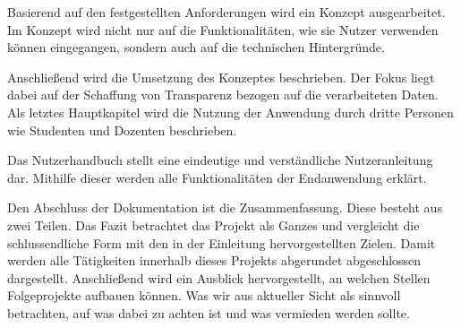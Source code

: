 Basierend auf den festgestellten Anforderungen wird ein Konzept ausgearbeitet.
Im Konzept wird nicht nur auf die Funktionalitäten, wie sie Nutzer verwenden können eingegangen, sondern auch auf die technischen Hintergründe.

Anschließend wird die Umsetzung des Konzeptes beschrieben.
Der Fokus liegt dabei auf der Schaffung von Transparenz bezogen auf die verarbeiteten Daten.
Als letztes Hauptkapitel wird die Nutzung der Anwendung durch dritte Personen wie Studenten und Dozenten beschrieben.

Das Nutzerhandbuch stellt eine eindeutige und verständliche Nutzeranleitung dar.
Mithilfe dieser werden alle Funktionalitäten der Endanwendung erklärt.

Den Abschluss der Dokumentation ist die Zusammenfassung.
Diese besteht aus zwei Teilen.
Das Fazit betrachtet das Projekt als Ganzes und vergleicht die schlussendliche Form mit den in der Einleitung hervorgestellten Zielen. Damit werden alle Tätigkeiten innerhalb dieses Projekts abgerundet abgeschlossen dargestellt.
Anschließend wird ein Ausblick hervorgestellt, an welchen Stellen Folgeprojekte aufbauen können. Was wir aus aktueller Sicht als sinnvoll betrachten, auf was dabei zu achten ist und was vermieden werden sollte.


